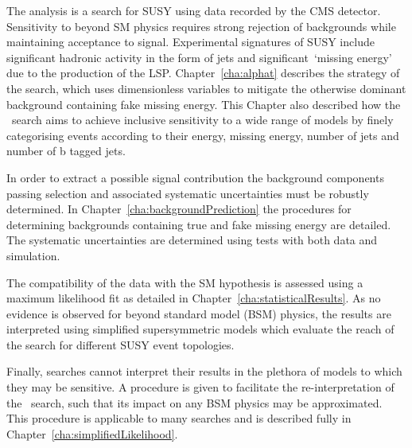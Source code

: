 The \alphat analysis is a search for SUSY using data recorded by the CMS detector. 
Sensitivity to beyond SM physics requires strong rejection of backgrounds while
maintaining acceptance to signal. Experimental signatures of SUSY include significant
hadronic activity in the form of jets and significant~`missing energy' due to the production
of the LSP. Chapter~\ref{cha:alphat} describes the strategy of the \alphat search, which uses
dimensionless variables to mitigate the otherwise dominant background containing fake missing energy.
This Chapter also described how the \alphat~search aims to achieve inclusive sensitivity 
to a wide range of models by finely categorising events according to 
their energy, missing energy, number of jets and number of b tagged jets.

In order to extract a possible signal contribution the background components passing selection 
and associated systematic uncertainties must be robustly determined. In Chapter~\ref{cha:backgroundPrediction}
the procedures for determining backgrounds containing true and fake missing
energy are detailed. The systematic uncertainties are determined using tests with 
both data and simulation. 

The compatibility of the data with the SM hypothesis is assessed using a maximum likelihood fit 
as detailed in Chapter~\ref{cha:statisticalResults}. As no evidence is observed for beyond standard model (BSM) physics,
the results are interpreted using simplified supersymmetric models which evaluate the reach
of the search for different SUSY event topologies. 

Finally, searches cannot interpret their results in the plethora of models to which 
they may be sensitive. A procedure is given to facilitate the re-interpretation
of the \alphat~search, such that its impact on any BSM physics may be approximated.
This procedure is applicable to many searches and is described fully in 
Chapter~\ref{cha:simplifiedLikelihood}.

